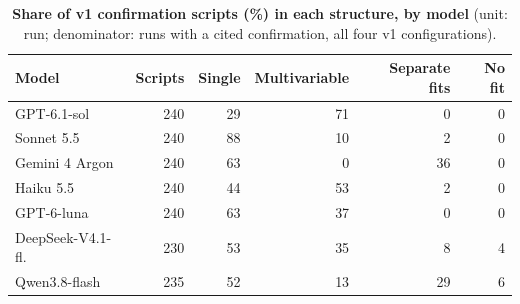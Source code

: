 \begin{table}[h]
\centering
\caption{\textbf{Share of v1 confirmation scripts (\%) in each structure, by model} (unit: run;
denominator: runs with a cited confirmation, all four v1 configurations).}
\label{tab:taxmodels}
\small
\begin{tabular}{lrrrrr}
\toprule
Model & Scripts & Single & Multivariable & Separate fits & No fit\\
\midrule
GPT-6.1-sol & 240 & 29 & 71 & 0 & 0\\
Sonnet 5.5 & 240 & 88 & 10 & 2 & 0\\
Gemini 4 Argon & 240 & 63 & 0 & 36 & 0\\
Haiku 5.5 & 240 & 44 & 53 & 2 & 0\\
GPT-6-luna & 240 & 63 & 37 & 0 & 0\\
DeepSeek-V4.1-fl. & 230 & 53 & 35 & 8 & 4\\
Qwen3.8-flash & 235 & 52 & 13 & 29 & 6\\
\bottomrule
\end{tabular}
\end{table}
